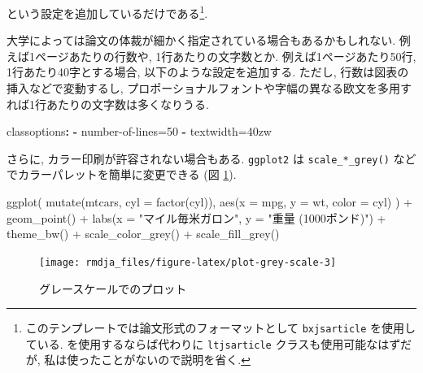\documentclass[
  xelatex,ja=standard,jafont=noto]{bxjsbook}
\newenvironment{Shaded}{\begin{snugshade}}{\end{snugshade}}
\newcommand{\AttributeTok}[1]{\textcolor[rgb]{0.77,0.63,0.00}{#1}}
\newcommand{\FunctionTok}[1]{\textcolor[rgb]{0.00,0.00,0.00}{#1}}
\newcommand{\KeywordTok}[1]{\textcolor[rgb]{0.13,0.29,0.53}{\textbf{#1}}}
\newcommand{\NormalTok}[1]{#1}
\newcommand{\SpecialCharTok}[1]{\textcolor[rgb]{0.00,0.00,0.00}{#1}}
\newcommand{\StringTok}[1]{\textcolor[rgb]{0.31,0.60,0.02}{#1}}
\theoremstyle{definition}
\theoremstyle{definition}
\theoremstyle{definition}
\theoremstyle{definition}
\theoremstyle{remark}
\begin{document}
という設定を追加しているだけである\footnote{このテンプレートでは論文形式のフォーマットとして
  \texttt{bxjsarticle} を使用している.
  \LuaLaTeX を使用するならば代わりに \texttt{ltjsarticle}
  クラスも使用可能なはずだが, 私は使ったことがないので説明を省く.}.

大学によっては論文の体裁が細かく指定されている場合もあるかもしれない.
例えば1ページあたりの行数や, 1行あたりの文字数とか.
例えば1ページあたり50行, 1行あたり40字とする場合,
以下のような設定を追加する. ただし, 行数は図表の挿入などで変動するし,
プロポーショナルフォントや字幅の異なる欧文を多用すれば1行あたりの文字数は多くなりうる.

\begin{Shaded}
\begin{Highlighting}[]
\FunctionTok{classoptions}\KeywordTok{:}
\AttributeTok{  }\KeywordTok{{-}}\AttributeTok{ }\StringTok{\textquotesingle{}number{-}of{-}lines=50\textquotesingle{}}
\AttributeTok{  }\KeywordTok{{-}}\AttributeTok{ }\StringTok{\textquotesingle{}textwidth=40zw\textquotesingle{}}
\end{Highlighting}
\end{Shaded}

さらに, カラー印刷が許容されない場合もある. \texttt{ggplot2} は
\texttt{scale\_*\_grey()} などでカラーパレットを簡単に変更できる (図
\ref{fig:plot-grey-scale}).

\begin{Shaded}
\begin{Highlighting}[numbers=left,,]
\FunctionTok{ggplot}\NormalTok{(}
  \FunctionTok{mutate}\NormalTok{(mtcars, }\AttributeTok{cyl =} \FunctionTok{factor}\NormalTok{(cyl)),}
  \FunctionTok{aes}\NormalTok{(}\AttributeTok{x =}\NormalTok{ mpg, }\AttributeTok{y =}\NormalTok{ wt, }\AttributeTok{color =}\NormalTok{ cyl)}
\NormalTok{) }\SpecialCharTok{+}
  \FunctionTok{geom\_point}\NormalTok{() }\SpecialCharTok{+}
  \FunctionTok{labs}\NormalTok{(}\AttributeTok{x =} \StringTok{"マイル毎米ガロン"}\NormalTok{, }\AttributeTok{y =} \StringTok{"重量 (1000ポンド)"}\NormalTok{) }\SpecialCharTok{+}
  \FunctionTok{theme\_bw}\NormalTok{() }\SpecialCharTok{+}
  \FunctionTok{scale\_color\_grey}\NormalTok{() }\SpecialCharTok{+}
  \FunctionTok{scale\_fill\_grey}\NormalTok{()}
\end{Highlighting}
\end{Shaded}

\begin{figure}

{\centering \texttt{[image: rmdja\_files/figure-latex/plot-grey-scale-3]} 

}

\caption{グレースケールでのプロット}\label{fig:plot-grey-scale}
\end{figure}
\end{document}
